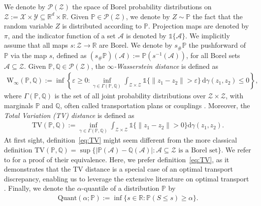 \documentclass[11pt,a4paper]{article}
\begin{document}
We denote by $\mathcal P(\mathcal Z)$ the space of Borel probability distributions on $\mathcal Z:= \mathcal X \times \mathcal Y \subseteq \mathbb R^{d}\times \mathbb R$. Given $\mathbb P \in \mathcal P(\mathcal Z)$, we denote by $Z \sim \mathbb P$ the fact that the random variable $Z$ is distributed according to $\mathbb P$. Projection maps are denoted by $\pi$, and the indicator function of a set $\mathcal A$ is denoted by $\mathds{1}\{\mathcal A\}$. We implicitly assume that all maps $s:\mathcal Z \to \mathbb R$ are Borel. We denote by $s_\# \mathbb P$ the pushforward of $\mathbb P$ via the map $s$, defined as $(s_\# \mathbb P)(\mathcal A) := \mathbb P(s^{-1}(\mathcal A))$, for all Borel sets $\mathcal A \subseteq \mathcal Z$. Given $\mathbb P, \mathbb Q \in \mathcal P(\mathcal Z)$, the \emph{$\infty$-Wasserstein distance} is defined as
\begin{align}
\label{eq:W:infty}
    \text{W}_\infty(\mathbb P, \mathbb Q) := \inf\left\{\varepsilon \geq 0: \inf_{\gamma \in \Gamma(\mathbb P, \mathbb Q)} \int_{\mathcal Z \times \mathcal Z} \mathds{1}\{\|z_1 - z_2\| > \varepsilon\} \, \mathrm{d} \gamma(z_1,z_2) \leq 0\right\},
\end{align}
where $\Gamma(\mathbb P, \mathbb Q)$ is the set of all joint probability distributions over $\mathcal Z \times \mathcal Z$, with marginals $\mathbb P$ and $\mathbb Q$, often called transportation plans or couplings \cite{villani2009optimal}. Moreover, the \emph{Total Variation (TV) distance} is defined as
\begin{align}
\label{eq:TV}
    \text{TV}(\mathbb P, \mathbb Q) := \inf_{\gamma \in \Gamma(\mathbb P, \mathbb Q)} \int_{\mathcal Z \times \mathcal Z} \mathds{1}\{\|z_1 - z_2\| > 0\} \mathrm{d} \gamma(z_1,z_2).
\end{align}
At first sight, definition~\eqref{eq:TV} might seem different from the more classical definition $\text{TV}(\mathbb P, \mathbb Q) = \sup\{|\mathbb P(\mathcal A) - \mathbb Q(\mathcal A)|: \mathcal A \subseteq \mathcal Z \text{ is a Borel set}\}$. We refer to \cite[Proposition~2.24]{kuhn2024distributionally} for a proof of their equivalence. Here, we prefer definition~\eqref{eq:TV}, as it demonstrates that the TV distance is a special case of an optimal transport discrepancy, enabling us to leverage the extensive literature on optimal transport \cite{villani2009optimal}. Finally, we denote the $\alpha$-quantile of a distribution $\mathbb P$ by
\begin{align}
\label{eq:Quant}
\text{Quant}(\alpha; \mathbb{P}) := \inf \{s \in \mathbb{R} : \mathbb{P}(S \leq s) \geq \alpha\}.
\end{align}
\end{document}
